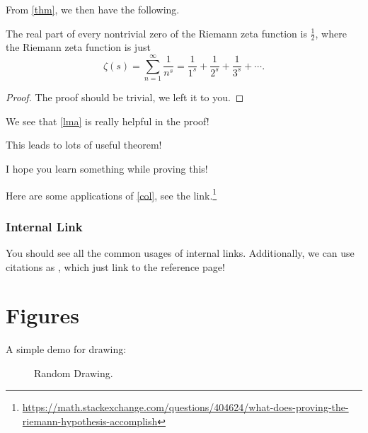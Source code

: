 \begin{corollary}\label{col}
	From \autoref{thm}, we then have the following.

	\par The real part of every nontrivial zero of the Riemann zeta function is \(\frac{1}{2}\), where the
	Riemann zeta function is just
	\[
		\zeta (s)=\sum _{n=1}^{\infty }{\frac {1}{n^{s}}}={\frac {1}{1^{s}}}+{\frac {1}{2^{s}}}+{\frac {1}{3^{s}}}+\cdots.
	\]
\end{corollary}
\begin{proof}
	The proof should be trivial, we left it to you.
\end{proof}
\begin{prev}
	We see that \autoref{lma} is really helpful in the proof!
\end{prev}
\begin{remark}
	This leads to lots of useful theorem!
\end{remark}
\begin{note}
	I hope you learn something while proving this!
\end{note}
\begin{eg}
	Here are some applications of \autoref{col}, see the link.\footnote{\url{https://math.stackexchange.com/questions/404624/what-does-proving-the-riemann-hypothesis-accomplish}}
\end{eg}

\subsubsection{Internal Link}
You should see all the common usages of internal links. Additionally, we can use citations as \cite{newton1726philosophiae}, which just link
to the reference page!

\section{Figures}
A simple demo for drawing:
\begin{figure}[H]
	\centering
	\caption[Caption]{Random Drawing.\footnotemark}
	\label{fig:test}
\end{figure}
